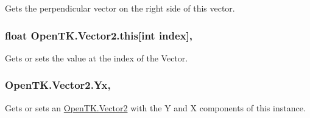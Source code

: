 Gets the perpendicular vector on the right side of this vector. 

\hypertarget{struct_open_t_k_1_1_vector2_a43319657b1c446e2b969e8123a1a0521}{
\subsubsection[{this[int index]}]{\setlength{\rightskip}{0pt plus 5cm}float Open\-T\-K.\-Vector2.\-this\mbox{[}int index\mbox{]}\hspace{0.3cm}{\ttfamily [get]}, {\ttfamily [set]}}}\label{struct_open_t_k_1_1_vector2_a43319657b1c446e2b969e8123a1a0521}


Gets or sets the value at the index of the Vector. 

\hypertarget{struct_open_t_k_1_1_vector2_aa9c081d083d0430ff8ef9e6ab0797691}{
\subsubsection[{Yx}]{ Open\-T\-K.\-Vector2.\-Yx\hspace{0.3cm}{\ttfamily [get]}, {\ttfamily [set]}}}\label{struct_open_t_k_1_1_vector2_aa9c081d083d0430ff8ef9e6ab0797691}


Gets or sets an \hyperlink{struct_open_t_k_1_1_vector2}{Open\-T\-K.\-Vector2} with the Y and X components of this instance. 

